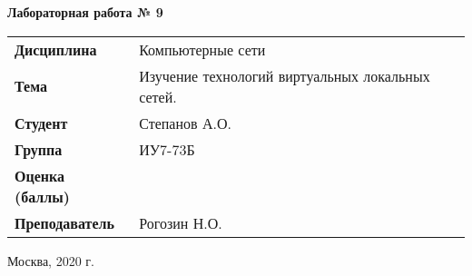 \begin{center}
    \textbf{Лабораторная работа № 9} \\
    \vspace{0.5cm}
\end{center}

\vspace{4cm}

\begin{flushleft}
    \begin{tabular}{ll}
        \textbf{Дисциплина} & Компьютерные сети \\
        \textbf{Тема} & Изучение технологий виртуальных локальных сетей. \\
        \textbf{Студент} & Степанов А.О. \\
        \textbf{Группа} & ИУ7-73Б \\
        \textbf{Оценка (баллы)} & \\
        \textbf{Преподаватель} & Рогозин Н.О. \\
    \end{tabular}
\end{flushleft}

\vspace{4cm}

\begin{center}
    Москва, 2020 г.
\end{center}
